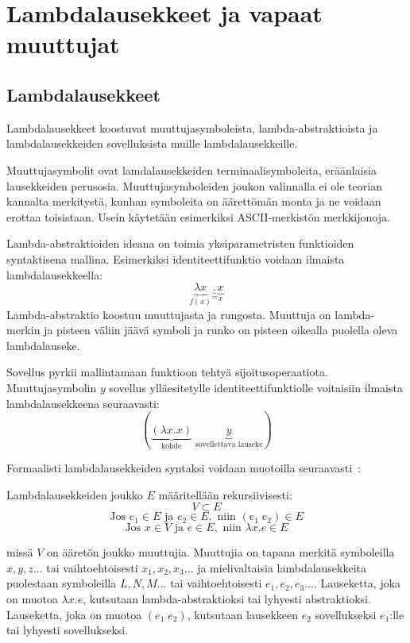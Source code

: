 \section{Lambdalausekkeet ja vapaat muuttujat}

\subsection{Lambdalausekkeet}

Lambdalausekkeet koostuvat muuttujasymboleista, lambda-abstraktioista ja lambdalausekkeiden sovelluksista muille lambdalausekkeille.
\par 
Muuttujasymbolit ovat lamdalausekkeiden terminaalisymboleita, eräänlaisia lausekkeiden perusosia. Muuttujasymboleiden joukon valinnalla ei ole teorian kannalta merkitystä, kunhan symboleita on äärettömän monta ja ne voidaan erottaa toisistaan. Usein käytetään esimerkiksi ASCII-merkistön merkkijonoja.
\par
Lambda-abstraktioiden ideana on toimia yksiparametristen funktioiden syntaktisena mallina. Esimerkiksi identiteettifunktio voidaan ilmaista lambdalausekkeella: 
\[ \underbrace{ \lambda x }_{ f(x) } \underbrace{ . }_{ = }  \underbrace{ x }_{x} \]
Lambda-abstraktio koostuu muuttujasta ja rungosta. Muuttuja on lambda-merkin ja pisteen väliin jäävä symboli ja runko on pisteen oikealla puolella oleva lambdalauseke. 
\par
Sovellus pyrkii mallintamaan funktioon tehtyä sijoitusoperaatiota. Muuttujasymbolin $y$ sovellus ylläesitetylle identiteettifunktiolle voitaisiin ilmaista lambdalausekkeena seuraavasti:
\[ ( \underbrace{ (\lambda x . x ) }_{ \text{kohde} } \; \underbrace{ y }_{ \text{sovellettava lauseke} } ) \]
\par
Formaalisti lambdalausekkeiden syntaksi voidaan muotoilla seuraavasti~\cite[s.~8]{Hudak89}:
\pagebreak
\begin{maar}[lambdalausekkeet]
Lambdalausekkeiden joukko $E$ määritellään rekursiivisesti: 
\[ V \subset E \]
\[ \text{Jos } e_{1} \in E \text{ ja } e_{2} \in E, \text{ niin }  (e_{1} \; e_{2}) \in E \]
\[ \text{Jos } x \in V \text{ ja } e \in E, \text{ niin } \lambda x.e \in E \]

missä $V$ on ääretön joukko muuttujia. Muuttujia on tapana merkitä symboleilla $x, y,z...$ tai vaihtoehtoisesti $x_{1}, x_{2}, x_{3}...$ ja mielivaltaisia lambdalausekkeita puolestaan symboleilla $L, N, M ...$ tai vaihtoehtoisesti $e_{1}, e_{2}, e_{3}...$.  Lauseketta, joka on muotoa $\lambda x.e$, kutsutaan lambda-abstraktioksi tai lyhyesti abstraktioksi. Lauseketta, joka on muotoa $(e_{1} \; e_{2})$, kutsutaan lausekkeen $e_{2}$ sovellukseksi $e_{1}$:lle tai lyhyesti sovellukseksi.
\end{maar}

